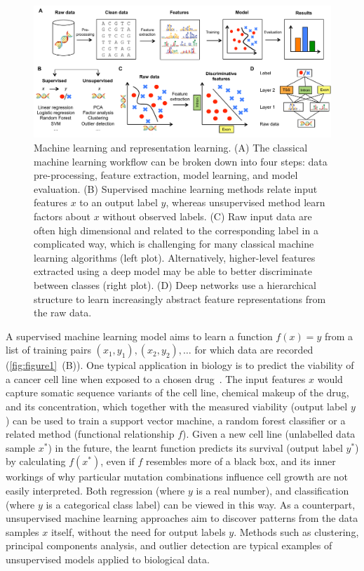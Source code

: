 \begin{figure}[htbp!]
\centering
\includegraphics[width=1.0\textwidth]{figure1}
\caption[Machine learning and representation learning.]{Machine learning and representation learning. (A) The classical machine learning workflow can be broken down into four steps: data pre-processing, feature extraction, model learning, and model evaluation. (B) Supervised machine learning methods relate input features $x$ to an output label $y$, whereas unsupervised method learn factors about $x$ without observed labels. (C) Raw input data are often high dimensional and related to the corresponding label in a complicated way, which is challenging for many classical machine learning algorithms (left plot). Alternatively, higher-level features extracted using a deep model may be able to better discriminate between classes (right plot). (D) Deep networks use a hierarchical structure to learn increasingly abstract feature representations from the raw data.}
\label{fig:figure1}
\end{figure}

A supervised machine learning model aims to learn a function $f(x)=y$ from a list of training pairs $(x_1,y_1), (x_2,y_2),\ldots$ for which data are recorded (\autoref{fig:figure1}~(B)). One typical application in biology is to predict the viability of a cancer cell line when exposed to a chosen drug~\citep{eduati_prediction_2015,menden_machine_2013}. The input features $x$ would capture somatic sequence variants of the cell line, chemical makeup of the drug, and its concentration, which together with the measured viability (output label $y$) can be used to train a support vector machine, a random forest classifier or a related method (functional relationship $f$). Given a new cell line (unlabelled data sample $x^*$) in the future, the learnt function predicts its survival (output label $y^*$) by calculating $f(x^*)$, even if $f$ resembles more of a black box, and its inner workings of why particular mutation combinations influence cell growth are not easily interpreted. Both regression (where $y$ is a real number), and classification (where $y$ is a categorical class label) can be viewed in this way. As a counterpart, unsupervised machine learning approaches aim to discover patterns from the data samples $x$ itself, without the need for output labels $y$. Methods such as clustering, principal components analysis, and outlier detection are typical examples of unsupervised models applied to biological data.

